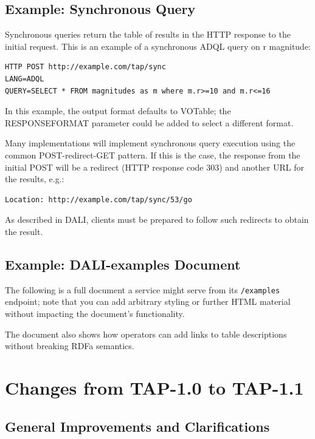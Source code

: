 \documentclass[11pt,letter]{ivoa}
\begin{document}
\subsection{Example: Synchronous Query}

Synchronous queries return the table of results in the HTTP response to the 
initial request. This is an example of a synchronous ADQL query on r magnitude:

\begin{verbatim}
HTTP POST http://example.com/tap/sync
LANG=ADQL
QUERY=SELECT * FROM magnitudes as m where m.r>=10 and m.r<=16
\end{verbatim}

In this example, the output format defaults to VOTable; 
the RESPONSEFORMAT parameter could be added to select a different format.

Many implementations will implement synchronous query execution using the 
common POST-redirect-GET pattern. If this is the case, the response from the 
initial POST will be a redirect (HTTP response code 303) and another URL for the 
results, e.g.: 

\begin{verbatim}
Location: http://example.com/tap/sync/53/go
\end{verbatim}

As described in DALI, clients must be prepared to follow such 
redirects to obtain the result.

\subsection{Example: DALI-examples Document}
\label{sec:example-example}

The following is a full document a service might serve from its
\verb|/examples| endpoint; note that you can add arbitrary styling or
further HTML material without impacting the document's functionality.

The document also shows how operators can add links to table
descriptions without breaking RDFa semantics.



\appendix

\section{Changes from TAP-1.0 to TAP-1.1}

\subsection{General Improvements and Clarifications}
\end{document}
